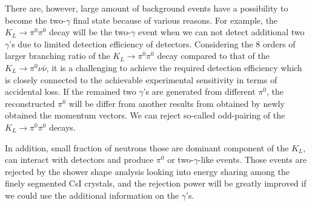 \documentclass[jkps,preprint,fleqn,showpacs,showkeys]{revtex4}
\begin{document}
There are, however, large amount of background events have a possibility to become the two-$\gamma$ final state because of various reasons. For example, the $K_L \rightarrow \pi^0 \pi^0$ decay will be the two-$\gamma$ event when we can not detect additional two $\gamma$'s due to limited detection efficiency of detectors. Considering the 8 orders of larger branching ratio of the $K_L \rightarrow \pi^0 \pi^0$ decay compared to that of the $K_L \rightarrow \pi^0 \nu \bar{\nu}$, it is a challenging to achieve the required detection efficiency which is closely connected to the achievable experimental sensitivity in terms of accidental loss. If the remained two $\gamma$'s are generated from different $\pi^0$, the reconstructed $\pi^0$ will be differ from another results from obtained by newly obtained the momentum vectors. We can reject so-called odd-pairing  of the $K_L \rightarrow \pi^0 \pi^0$ decays.

In addition, small fraction of neutrons those are dominant component of the $K_L$, can interact with detectors and produce $\pi^0$ or two-$\gamma$-like events. Those events are rejected by the shower shape analysis looking into energy sharing among the finely segmented CsI crystals, and the rejection power will be greatly improved if we could use the additional information on the $\gamma$'s.   




\end{document}
